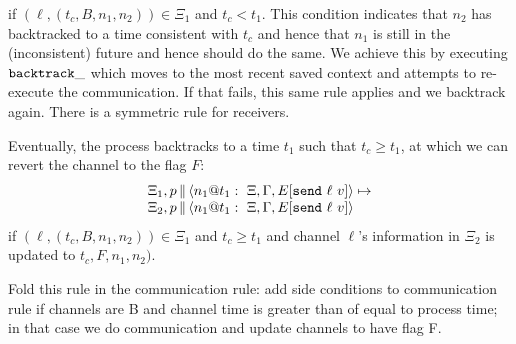 \documentclass{article}
\begin{document}
\begin{itemize}
if $(\ell,(t_c,B,n_1,n_2)) \in \Xi_1$ and $t_c < t_1$. This condition
indicates that $n_2$ has backtracked to a time consistent with $t_c$ and
hence that $n_1$ is still in the (inconsistent) future and hence should do
the same. We achieve this by executing $\abacktrack$ which moves to the most
recent saved context and attempts to re-execute the communication.  If that
fails, this same rule applies and we backtrack again.  There is a symmetric
rule for receivers.

Eventually, the process backtracks to a time $t_1$ such that $t_c \geq t_1$,
at which we can revert the channel to the flag $F$:
\[\begin{array}{l}
  \Xi_1,
  \parc{p}{\proc{n_1}{\Gamma}{\Xi}{E[\send{\ell}{v}]}{t_1}} \mapsto \\
  \Xi_2,
  \parc{p}{\proc{n_1}{\Gamma}{\Xi}{E[\send{\ell}{v}]}{t_1}} 
\end{array}\]
if $(\ell,(t_c,B,n_1,n_2)) \in \Xi_1$ and $t_c \geq t_1$ and channel $\ell$'s
information in $\Xi_2$ is updated to $t_c,F,n_1,n_2)$.

Fold this rule in the communication rule: add side conditions to
communication rule if channels are B and channel time is greater than of
equal to process time; in that case we do communication and update channels
to have flag F.

\end{itemize}

\end{document}
